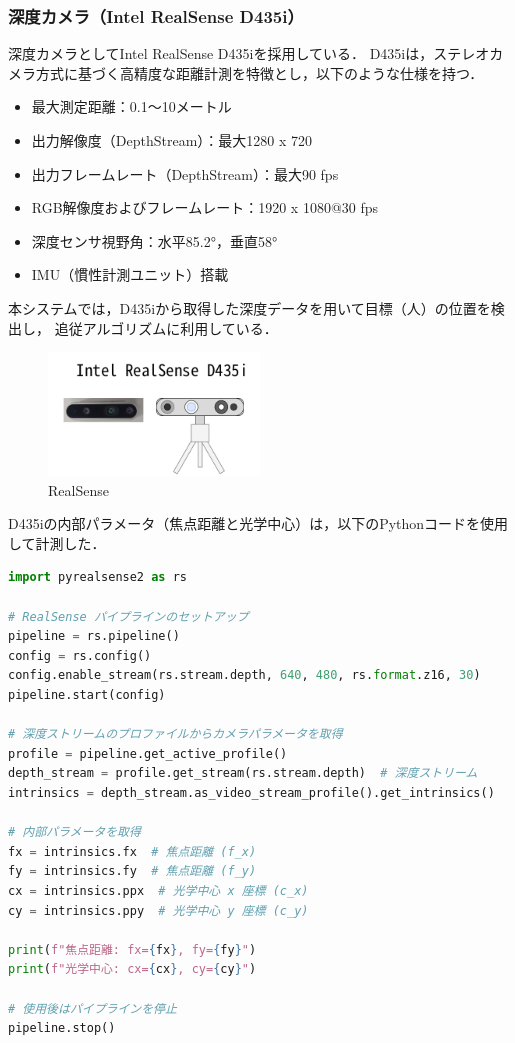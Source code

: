 \subsubsection{深度カメラ（Intel RealSense D435i）}
深度カメラとしてIntel RealSense D435iを採用している．
D435iは，ステレオカメラ方式に基づく高精度な距離計測を特徴とし，以下のような仕様を持つ\cite{realsense}．
\begin{itemize}
  \item 最大測定距離：0.1～10メートル
  \item 出力解像度（DepthStream）：最大1280 x 720
  \item 出力フレームレート（DepthStream）：最大90 fps
  \item RGB解像度およびフレームレート：1920 x 1080@30 fps
  \item 深度センサ視野角：水平85.2°，垂直58°
  \item IMU（慣性計測ユニット）搭載
\end{itemize}
本システムでは，D435iから取得した深度データを用いて目標（人）の位置を検出し，
追従アルゴリズムに利用している．

\begin{figure}[H]
  \centering
  \includegraphics[width=0.5\textwidth]{figure/RealSense.pdf}
  \caption{RealSense}
  \label{fig:RealSense}
\end{figure}

D435iの内部パラメータ（焦点距離と光学中心）は，以下のPythonコードを使用して計測した．

\begin{lstlisting}[language=Python, caption=RealSense内部パラメータの取得]
import pyrealsense2 as rs

# RealSense パイプラインのセットアップ
pipeline = rs.pipeline()
config = rs.config()
config.enable_stream(rs.stream.depth, 640, 480, rs.format.z16, 30)
pipeline.start(config)

# 深度ストリームのプロファイルからカメラパラメータを取得
profile = pipeline.get_active_profile()
depth_stream = profile.get_stream(rs.stream.depth)  # 深度ストリーム
intrinsics = depth_stream.as_video_stream_profile().get_intrinsics()

# 内部パラメータを取得
fx = intrinsics.fx  # 焦点距離 (f_x)
fy = intrinsics.fy  # 焦点距離 (f_y)
cx = intrinsics.ppx  # 光学中心 x 座標 (c_x)
cy = intrinsics.ppy  # 光学中心 y 座標 (c_y)

print(f"焦点距離: fx={fx}, fy={fy}")
print(f"光学中心: cx={cx}, cy={cy}")

# 使用後はパイプラインを停止
pipeline.stop()
\end{lstlisting}

